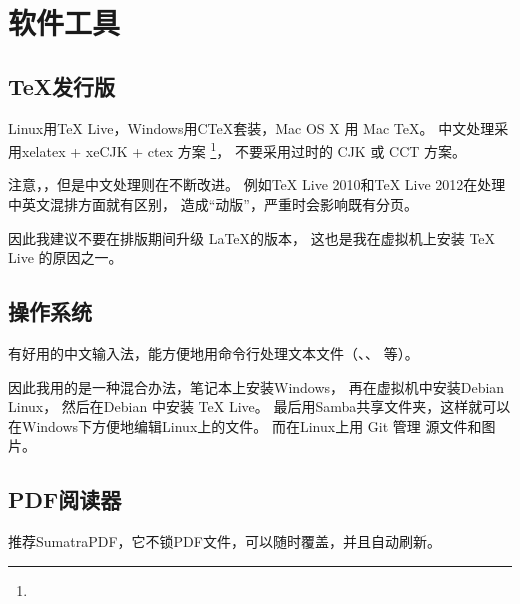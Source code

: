 
\section{软件工具}

\subsection{\TeX 发行版}
Linux用TeX Live，Windows用CTeX套装，Mac OS X 用 Mac TeX。
中文处理采用xelatex + xeCJK + ctex 方案
\footnote{}，
不要采用过时的 CJK 或 CCT 方案。

注意，，但是中文处理则在不断改进。
例如TeX Live 2010和TeX Live 2012在处理中英文混排方面就有区别，
造成“动版”，严重时会影响既有分页。

\vspace{1ex}
\centerline{}

\vspace{1ex}
\centerline{}

\vspace{1ex}
因此我建议不要在排版期间升级 \LaTeX 的版本，
这也是我在虚拟机上安装 TeX Live 的原因之一。

\subsection{操作系统}
有好用的中文输入法，能方便地用命令行处理文本文件（、、 等）。

因此我用的是一种混合办法，笔记本上安装Windows，
再在虚拟机中安装Debian Linux，
然后在Debian 中安装 TeX Live。
最后用Samba共享文件夹，这样就可以在Windows下方便地编辑Linux上的文件。
而在Linux上用 Git 管理  源文件和图片。

\subsection{PDF阅读器}
推荐SumatraPDF，它不锁PDF文件，可以随时覆盖，并且自动刷新。
